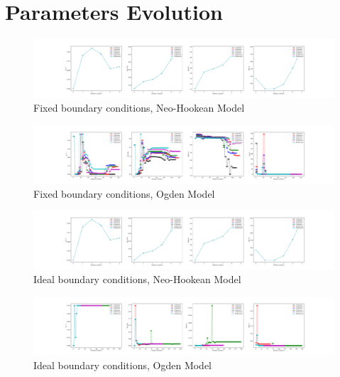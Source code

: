 \documentclass{article}
\begin{document}
\newpage

\section{Parameters Evolution}

\centering
\begin{figure}[h!]
\centering
\includegraphics[width=1\linewidth, trim= 250 0 250 0]{ParametersEvolutionFixedNeo-Hookean}
\caption{Fixed boundary conditions, Neo-Hookean Model}
\end{figure}

\begin{figure}[h!]
\centering
\includegraphics[width=\linewidth, trim= 250 0 250 0]{ParametersEvolutionFixedOgden}
\caption{Fixed boundary conditions, Ogden Model}
\end{figure}

\begin{figure}[h!]
\centering
\includegraphics[width=\linewidth, trim= 250 0 250 0]{ParametersEvolutionIdealNeo-Hookean}
\caption{Ideal boundary conditions, Neo-Hookean Model}
\end{figure}

\begin{figure}[h!]
\centering
\includegraphics[width=\linewidth, trim= 250 0 250 0]{ParametersEvolutionIdealOgden}
\caption{Ideal boundary conditions, Ogden Model}
\end{figure}
\end{document}
